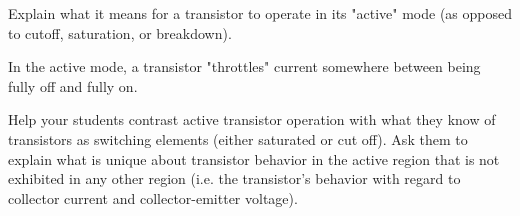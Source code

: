 

Explain what it means for a transistor to operate in its "active" mode (as opposed to cutoff, saturation, or breakdown).







In the active mode, a transistor "throttles" current somewhere between being fully off and fully on.







Help your students contrast active transistor operation with what they know of transistors as switching elements (either saturated or cut off).  Ask them to explain what is unique about transistor behavior in the active region that is not exhibited in any other region (i.e. the transistor's behavior with regard to collector current and collector-emitter voltage).




